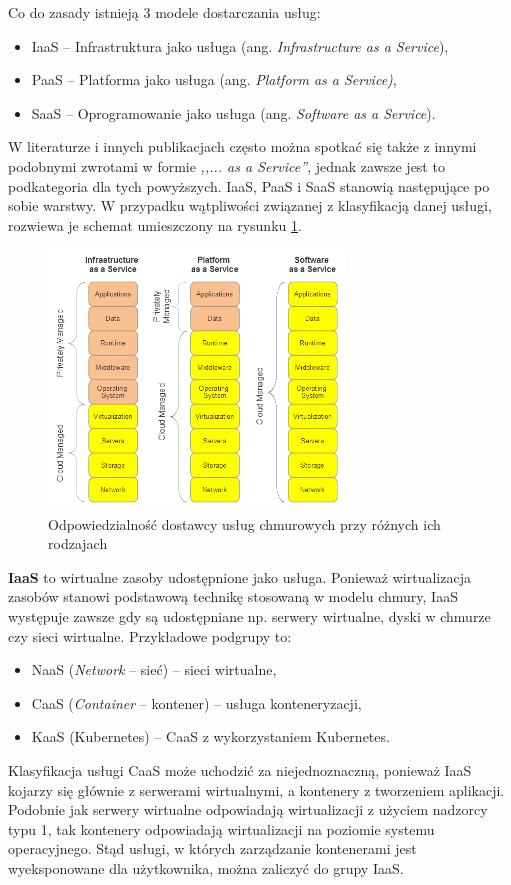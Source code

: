 \documentclass[12pt,a4paper,twoside,titlepage,openright]{book}
\begin{document}
Co do zasady istnieją 3 modele dostarczania usług:
\begin{itemize}
\item IaaS -- Infrastruktura jako usługa (ang. \textit{Infrastructure as a Service}),
\item PaaS -- Platforma jako usługa (ang. \textit{Platform as a Service)},
\item SaaS -- Oprogramowanie jako usługa (ang. \textit{Software as a Service}).
\end{itemize}
W literaturze i innych publikacjach często można spotkać się także z innymi podobnymi zwrotami w formie \textit{,,... as a Service''}, jednak zawsze jest to podkategoria dla tych powyższych. IaaS, PaaS i SaaS stanowią następujące po sobie warstwy. W przypadku wątpliwości związanej z klasyfikacją danej usługi, rozwiewa je schemat umieszczony na rysunku \ref{fig:iaas-paas-saas}.

\begin{figure}[h]
	\centering
			\includegraphics[width=0.7\textwidth]{iaas-paas-saas.png}
		\caption{Odpowiedzialność dostawcy usług chmurowych przy różnych ich rodzajach \cite{iotArchitects}}
		\label{fig:iaas-paas-saas}
\end{figure}

\textbf{IaaS} to wirtualne zasoby udostępnione jako usługa. Ponieważ wirtualizacja zasobów stanowi podstawową technikę stosowaną w modelu chmury, IaaS występuje zawsze gdy są udostępniane np. serwery wirtualne, dyski w chmurze czy sieci wirtualne. Przykładowe podgrupy to:
\begin{itemize}
\item NaaS (\textit{Network} -- sieć) -- sieci wirtualne,
\item CaaS (\textit{Container} -- kontener) -- usługa konteneryzacji,
\item KaaS (Kubernetes) -- CaaS z wykorzystaniem Kubernetes.
\end{itemize}
Klasyfikacja usługi CaaS może uchodzić za niejednoznaczną, ponieważ IaaS kojarzy się głównie z serwerami wirtualnymi, a kontenery z tworzeniem aplikacji. Podobnie jak serwery wirtualne odpowiadają wirtualizacji z użyciem nadzorcy typu 1, tak kontenery odpowiadają wirtualizacji na poziomie systemu operacyjnego. Stąd usługi, w których zarządzanie kontenerami jest wyeksponowane dla użytkownika, można zaliczyć do grupy IaaS.
\end{document}
